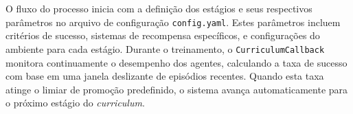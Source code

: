 O fluxo do processo inicia com a definição dos estágios e seus respectivos parâmetros no arquivo de configuração \texttt{config.yaml}. Estes parâmetros incluem critérios de sucesso, sistemas de recompensa específicos, e configurações do ambiente para cada estágio. Durante o treinamento, o \texttt{CurriculumCallback} monitora continuamente o desempenho dos agentes, calculando a taxa de sucesso com base em uma janela deslizante de episódios recentes. Quando esta taxa atinge o limiar de promoção predefinido, o sistema avança automaticamente para o próximo estágio do \textit{curriculum}.











